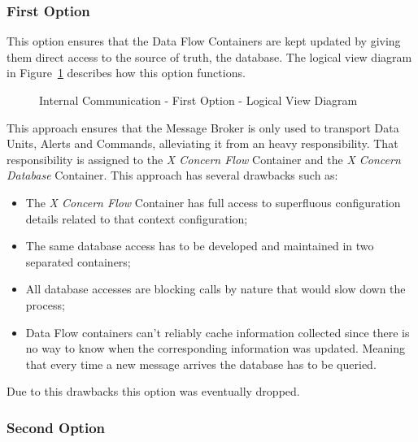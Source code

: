 \subsubsection{First Option}
\label{subsubsec:design:alternatives:internal:first}

This option ensures that the Data Flow Containers are kept updated by giving them direct access to the source of truth, the database. The logical view diagram in Figure~\ref{fig:design:alternatives:internal:first:diagram} describes how this option functions.

\begin{figure}[H]
   \centering
   \resizebox{\columnwidth}{!}
   {
      
   }
   \caption[Internal Communication - First Option - Logical View Diagram]{Internal Communication - First Option - Logical View Diagram}
   \label{fig:design:alternatives:internal:first:diagram}
\end{figure}

This approach ensures that the Message Broker is only used to transport Data Units, Alerts and Commands, alleviating it from an heavy responsibility.
That responsibility is assigned to the \textit{X Concern Flow} Container and the \textit{X Concern Database} Container.
This approach has several drawbacks such as:

\begin{itemize}
   \item The \textit{X Concern Flow} Container has full access to superfluous configuration details related to that context configuration;
   \item The same database access has to be developed and maintained in two separated containers;
   \item All database accesses are blocking calls by nature that would slow down the process;
   \item Data Flow containers can't reliably cache information collected since there is no way to know when the corresponding information was updated. Meaning that every time a new message arrives the database has to be queried.
\end{itemize}

Due to this drawbacks this option was eventually dropped.

\subsubsection{Second Option}
\label{subsubsec:design:alternatives:internal:second}

